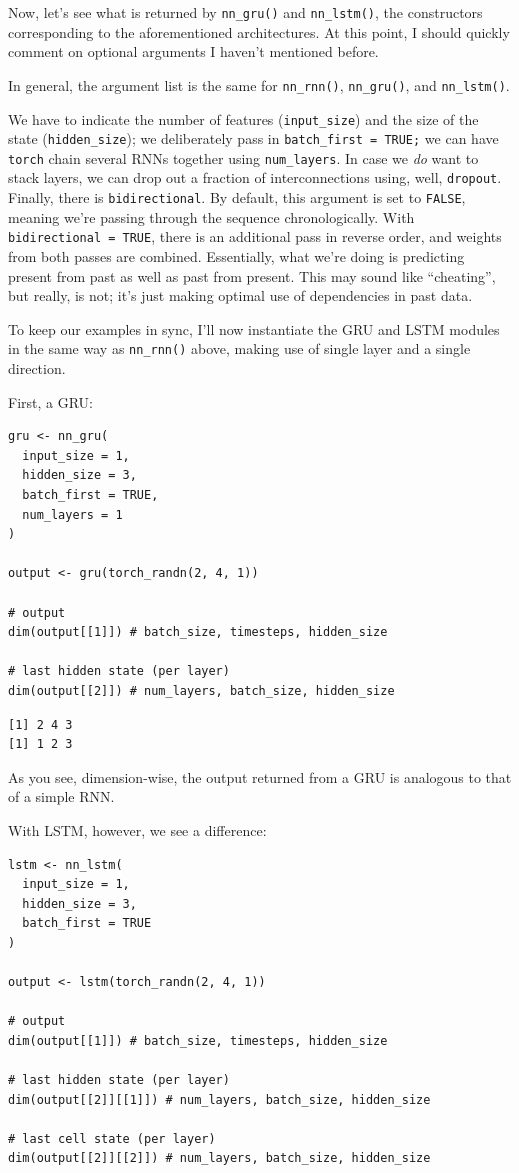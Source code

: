 \documentclass[
  letterpaper,
]{krantz}
\begin{document}
Now, let's see what is returned by \texttt{nn\_gru()} and
\texttt{nn\_lstm()}, the constructors corresponding to the
aforementioned architectures. At this point, I should quickly comment on
optional arguments I haven't mentioned before.

In general, the argument list is the same for \texttt{nn\_rnn()},
\texttt{nn\_gru()}, and \texttt{nn\_lstm()}.

We have to indicate the number of features (\texttt{input\_size}) and
the size of the state (\texttt{hidden\_size}); we deliberately pass in
\texttt{batch\_first\ =\ TRUE;} we can have \texttt{torch} chain several
RNNs together using \texttt{num\_layers}. In case we \emph{do} want to
stack layers, we can drop out a fraction of interconnections using,
well, \texttt{dropout}. Finally, there is \texttt{bidirectional}. By
default, this argument is set to \texttt{FALSE}, meaning we're passing
through the sequence chronologically. With
\texttt{bidirectional\ =\ TRUE}, there is an additional pass in reverse
order, and weights from both passes are combined. Essentially, what
we're doing is predicting present from past as well as past from
present. This may sound like ``cheating'', but really, is not; it's just
making optimal use of dependencies in past data.

To keep our examples in sync, I'll now instantiate the GRU and LSTM
modules in the same way as \texttt{nn\_rnn()} above, making use of
single layer and a single direction.

First, a GRU:

\begin{verbatim}
gru <- nn_gru(
  input_size = 1, 
  hidden_size = 3, 
  batch_first = TRUE,
  num_layers = 1
)

output <- gru(torch_randn(2, 4, 1))

# output
dim(output[[1]]) # batch_size, timesteps, hidden_size

# last hidden state (per layer)
dim(output[[2]]) # num_layers, batch_size, hidden_size
\end{verbatim}

\begin{verbatim}
[1] 2 4 3
[1] 1 2 3
\end{verbatim}

As you see, dimension-wise, the output returned from a GRU is analogous
to that of a simple RNN.

With LSTM, however, we see a difference:

\begin{verbatim}
lstm <- nn_lstm(
  input_size = 1,
  hidden_size = 3,
  batch_first = TRUE
)

output <- lstm(torch_randn(2, 4, 1))

# output
dim(output[[1]]) # batch_size, timesteps, hidden_size

# last hidden state (per layer)
dim(output[[2]][[1]]) # num_layers, batch_size, hidden_size

# last cell state (per layer)
dim(output[[2]][[2]]) # num_layers, batch_size, hidden_size
\end{verbatim}
\end{document}
